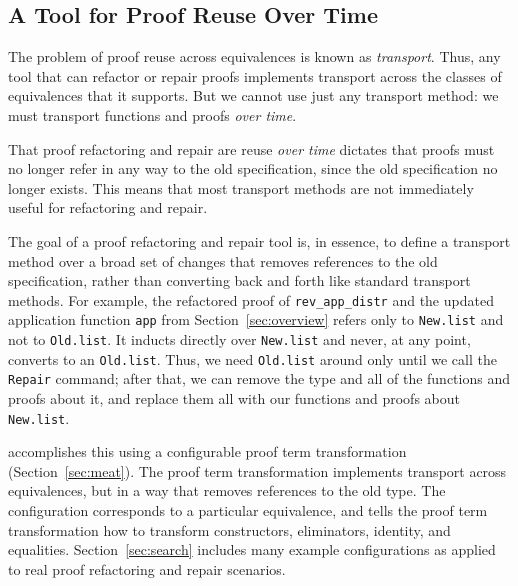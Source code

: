 \subsection{A Tool for Proof Reuse Over Time}
\label{sec:time}

The problem of proof reuse across equivalences is known as \textit{transport}. %
Thus, any tool that can refactor or repair proofs implements transport across the classes
of equivalences that it supports.
But we cannot use just any transport method: we must transport functions and proofs \textit{over time}.

That proof refactoring and repair are reuse \textit{over time} dictates that proofs
must no longer refer in any way to the old specification, since the old specification no longer exists.
This means that most transport methods %
are not immediately useful for refactoring and repair.

The goal of a proof refactoring and repair tool is, in essence, to
define a transport method over a broad set of changes that
removes references to the old specification, rather than converting back and forth
like standard transport methods.
For example, the refactored proof of \lstinline{rev_app_distr} and the updated application function \lstinline{app}
from Section~\ref{sec:overview} refers only to \lstinline{New.list} and not to \lstinline{Old.list}.
It inducts directly over \lstinline{New.list} and never, at any point, converts to an \lstinline{Old.list}.
Thus, we need \lstinline{Old.list} around only until we call the \lstinline{Repair} command;
after that, we can remove the type and all of the functions and proofs about it, and replace them all with
our functions and proofs about \lstinline{New.list}.

\toolname accomplishes this using a configurable proof term transformation (Section~\ref{sec:meat}).
The proof term transformation implements transport across equivalences, but in a way that removes
references to the old type.
The configuration corresponds to a particular equivalence, and tells the proof term transformation how to transform
constructors, eliminators, identity, and equalities.
Section~\ref{sec:search} includes many example configurations as applied to real proof refactoring and repair scenarios.


